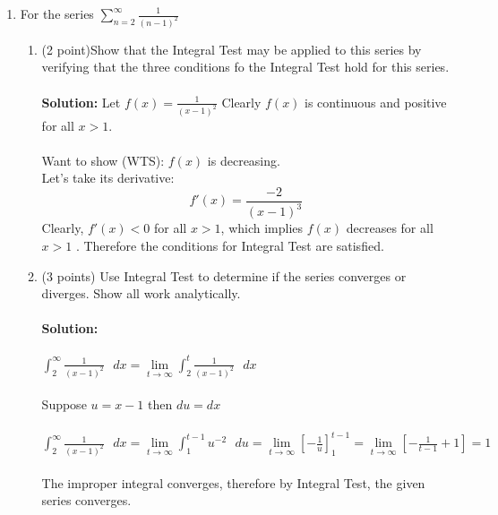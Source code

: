 \documentclass[paper=a4, fontsize=11pt]{scrartcl} %
\newcommand{\ds}{\displaystyle}
\numberwithin{equation}{section} %
\numberwithin{figure}{section} %
\numberwithin{table}{section} %
\begin{document}
\begin{enumerate}
\item For the series $\ds\sum_{n=2}^{\infty}\frac{1}{(n-1)^2}$
\begin{enumerate}
\item (2 point)\hspace{4mm}Show that the Integral Test may be applied to this series by verifying that the three conditions fo the  Integral Test hold for this series.\\\\
\textbf{Solution:} Let $\ds f(x)=\ds\frac{1}{(x-1)^2}$ Clearly $\ds f(x)$ is continuous and positive for all $\ds x\ds>\ds 1$.\\\\ Want to show (WTS): $\ds f(x)$ is decreasing.\\
Let's take its derivative:
$$f'(x)=\ds\frac{-2}{(x-1)^3}$$
Clearly, $f'(x)<0$ for all $\ds x>1$, which implies $f(x)$ decreases for all $x>1$ .
Therefore the conditions for Integral Test are satisfied.

\item (3 points)\hspace{4mm} Use Integral Test to determine if the series converges or diverges. Show all work analytically.\\\\
\textbf{Solution:}\\\\
$\ds\int_{2}^{\infty}\frac{1}{(x-1)^2}\ds\text{  } dx=\ds\lim\limits_{t\rightarrow\infty}\int_{2}^{t}\frac{1}{(x-1)^2}\text{  }dx$\\\\
Suppose $\ds u=x-1$ then $\ds du=dx$\\\\
$\ds\int_{2}^{\infty}\frac{1}{(x-1)^2}\ds\text{  } dx=\lim\limits_{t\rightarrow\infty}\int_{1}^{t-1}u^{-2}\text{  }du=\ds\lim\limits_{t\rightarrow\infty}\left[-\frac{1}{u}\right]_1^{t-1}=\lim\limits_{t\rightarrow\infty}\left[-\frac{1}{t-1}+1\right]=1$\\\\
The improper integral converges, therefore by Integral Test, the given series converges.
\end{enumerate}


\end{enumerate}
\end{document}
